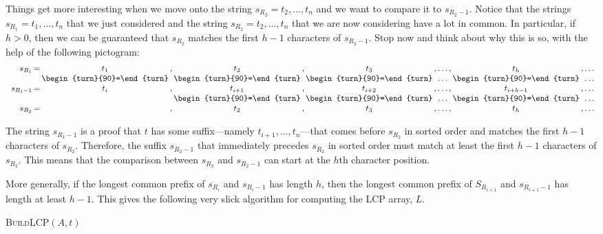 Things get more interesting when we move onto the string
$s_{R_2}=t_2,\ldots,t_n$ and we want to compare it to $s_{R_2-1}$. Notice
that the strings $s_{R_1}=t_1,\ldots,t_n$ that we just considered and
the string $s_{R_2}=t_2,\ldots,t_n$ that we are now considering have
a lot in common.  In particular, if $h>0$, then we can be guaranteed
that $s_{R_2}$ matches the first $h-1$ characters of $s_{R_2-1}$.
Stop now and think about why this is so, with the help of the following
pictogram:\\[\parskip]
\newcommand{\veq}{\begin{turn}{90}=\end{turn}}
\[
\begin{array}{r@{\,}c@{\,}c@{\,}c@{\,}c@{\,}c@{\,}c@{\,}c@{\,}c@{\,}c@{\,}c@{\,}c@{\,}c@{\,}c@{\,}c@{\,}}
s_{R_1}&=&t_1&,&t_2&,&t_3&,&\ldots&,&t_h&,&\ldots \\
       & &\veq&&\veq&&\veq&&\ldots&&\veq&&\ldots \\
s_{R_1-1}&=&t_i&,&t_{i+1}&,&t_{i+2}&,&\ldots&,&t_{i+h-1}&,&\ldots \\
       & & &&\veq&&\veq&&\ldots&&\veq&&\ldots \\
s_{R_2}&=& &,&t_2&,&t_{3}&,&\ldots&,&t_{h}&,&\ldots \\
\end{array}
\]

The string $s_{R_1-1}$ is a proof that $t$ has some suffix---namely $t_{i+1},\ldots,t_n$---that comes
before $s_{R_2}$ in sorted order and matches the first $h-1$ characters of
$s_{R_2}$.  Therefore, the suffix $s_{R_2-1}$ that immediately precedes $s_{R_2}$ in sorted order must match at least the first $h-1$ characters of $s_{R_2}$.  This means that the comparison between $s_{R_2}$ and $s_{R_2-1}$ can start at the $h$th character position.

More generally, if the longest common prefix of $s_{R_i}$ and $s_{R_i-1}$ has length $h$, then the longest common prefix of $S_{R_{i+1}}$ and $s_{R_{i+1}-1}$ has length at least $h-1$.  This gives the following very slick algorithm for computing the LCP array, $L$.

\noindent
\textsc{BuildLCP$(A,t)$}
\begin{algorithmic}
  \ENDFOR
        \ENDWHILE
    \ENDIF
  \ENDFOR
\end{algorithmic}

